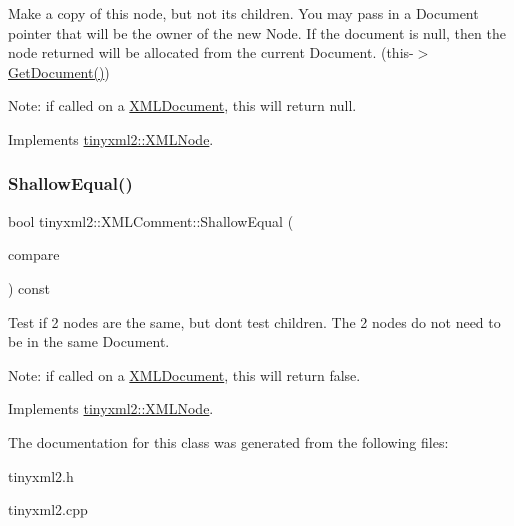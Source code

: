 Make a copy of this node, but not its children. You may pass in a Document pointer that will be the owner of the new Node. If the \textquotesingle{}document\textquotesingle{} is null, then the node returned will be allocated from the current Document. (this-\/$>$\mbox{\hyperlink{classtinyxml2_1_1_x_m_l_node_af343d1ef0b45c0020e62d784d7e67a68}{Get\+Document()}})

Note\+: if called on a \mbox{\hyperlink{classtinyxml2_1_1_x_m_l_document}{X\+M\+L\+Document}}, this will return null. 

Implements \mbox{\hyperlink{classtinyxml2_1_1_x_m_l_node_a8402cbd3129d20e9e6024bbcc0531283}{tinyxml2\+::\+X\+M\+L\+Node}}.

\mbox{\label{classtinyxml2_1_1_x_m_l_comment_a965d880a99d58dd915caa88dc37a9b51}} 
\subsubsection{\texorpdfstring{ShallowEqual()}{ShallowEqual()}}
{\footnotesize\ttfamily bool tinyxml2\+::\+X\+M\+L\+Comment\+::\+Shallow\+Equal (\begin{DoxyParamCaption}\item[{const \mbox{\hyperlink{classtinyxml2_1_1_x_m_l_node}{X\+M\+L\+Node}} $\ast$}]{compare }\end{DoxyParamCaption}) const\hspace{0.3cm}{\ttfamily [virtual]}}

Test if 2 nodes are the same, but don\textquotesingle{}t test children. The 2 nodes do not need to be in the same Document.

Note\+: if called on a \mbox{\hyperlink{classtinyxml2_1_1_x_m_l_document}{X\+M\+L\+Document}}, this will return false. 

Implements \mbox{\hyperlink{classtinyxml2_1_1_x_m_l_node_a7ce18b751c3ea09eac292dca264f9226}{tinyxml2\+::\+X\+M\+L\+Node}}.



The documentation for this class was generated from the following files\+:\begin{DoxyCompactItemize}
\item 
tinyxml2.\+h\item 
tinyxml2.\+cpp\end{DoxyCompactItemize}
